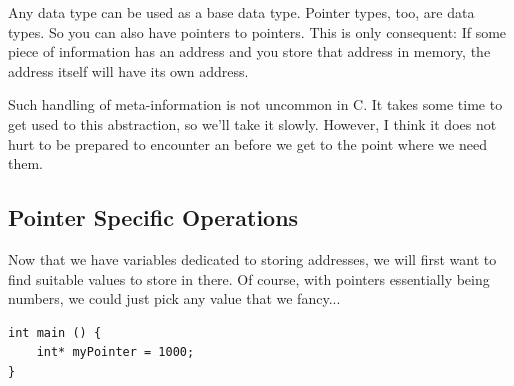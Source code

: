 {{{{\begin{defbox}
\begin{center}
\end{center}
\end{defbox}

\begin{plusbox}
Any data type can be used as a base data type. Pointer types, too, are data types. So you can also have pointers to pointers. This is only consequent: If some piece of information has an address and you store that address in memory, the address itself will have its own address.

Such handling of meta-information is not uncommon in C. It takes some time to get used to this abstraction, so we'll take it slowly. However, I think it does not hurt to be prepared to encounter an  before we get to the point where we need them.
\end{plusbox}


\subsection{Pointer Specific Operations}
Now that we have variables dedicated to storing addresses, we will first want to find suitable values to store in there. Of course, with pointers essentially being numbers, we could just pick any value that we fancy...

\begin{warnbox}[unguardedAddress.c, leftupper=7mm]
\begin{verbatim}
int main () {
    int* myPointer = 1000;
}
\end{verbatim}
\end{warnbox}

}}}}
